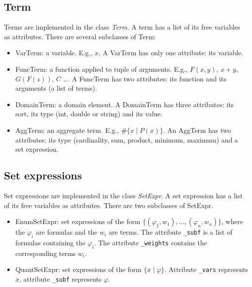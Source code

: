 \documentclass{article}
\begin{document}
\subsection*{Term}

Terms are implemented in the class \emph{Term}. A term has a list of its free variables as attributes. There are several subclasses of Term:
\begin{itemize}
	\item VarTerm: a variable. E.g., $x$. A VarTerm has only one attribute: its variable.
	\item FuncTerm: a function applied to tuple of arguments. E.g., $F(x,y)$, $x+y$, $G(F(z))$, $C$ \ldots. A FuncTerm has two attributes: its function and its arguments (a list of terms).
	\item DomainTerm: a domain element. A DomainTerm has three attributes: its sort, its type (int, double or string) and its value.
	\item AggTerm: an aggregate term. E.g., $\#\{ x \mid P(x) \}$. An AggTerm has two attributes: its type (cardinality, sum, product, minimum, maximum) and a set expression.
\end{itemize}

\subsection*{Set expressions}

Set expressions are implemented in the class \emph{SetExpr}. A set expression has a list of its free variables as attributes. There are two subclasses of SetExpr.
\begin{itemize}
	\item EnumSetExpr: set expressions of the form $\{ (\varphi_1,w_1), \ldots, (\varphi_n,w_n) \}$, where the $\varphi_i$ are formulas and the $w_i$ are terms. The attribute \texttt{\_subf} is a list of formulas containing the $\varphi_i$. The attribute \texttt{\_weights} contains the corresponding terms $w_i$.
	\item QuantSetExpr: set expressions of the form $\{ \overline{x} \mid \varphi \}$. Attribute \texttt{\_vars} represents $\overline{x}$, attribute \texttt{\_subf} represents $\varphi$.
\end{itemize}

\end{document}
